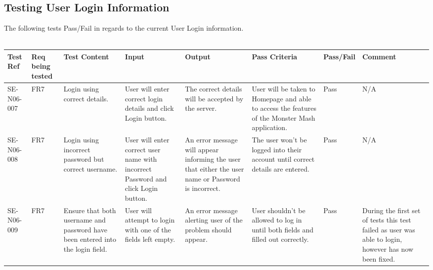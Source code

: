 \documentclass[titlepage]{article}
\begin{document}
{\subsection{Testing User Login Information}
The following tests Pass/Fail in regards to the current User Login information. \\
\\
\begin{sideways}
\centering
\begin{tabular}{|p{1cm}|p{1cm}|p{3cm}|p{2cm}|p{2cm}|p{3cm}|p{2cm}|p{2cm}|}
\hline
Test Ref & Req being tested & Test Content & Input & Output & Pass Criteria & Pass/Fail & Comment \\ 
\hline
SE-N06-007 & FR7 & Login using correct details. & User will enter correct login details and click Login button. & The correct details will be accepted by the server. & User will be taken to Homepage and able to access the features of the Monster Mash application. & Pass & N/A \\
\hline
SE-N06-008 & FR7 & Login using incorrect password but correct username. & User will enter correct user name with incorrect Password and click Login button. & An error message will appear informing the user that either the user name or Password is incorrect. & The user won't be logged into their account until correct details are entered. & Pass & N/A \\
\hline
SE-N06-009 & FR7 & Ensure that both username and password have been entered into the login field. & User will attempt to login with one of the fields left empty. & An error message alerting user of the problem should appear. & User shouldn't be allowed to log in until both fields and filled out correctly. & Pass & During the first set of tests this test failed as user was able to login, however has now been fixed. \\
\hline 
\end{tabular}
\end{sideways}
\newpage
}
\end{document}
